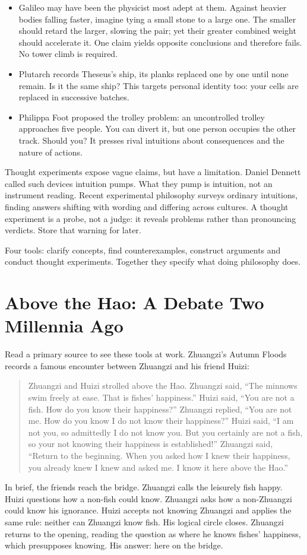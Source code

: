 \begin{itemize}
\item Galileo may have been the physicist most adept at them. Against heavier bodies falling faster, imagine tying a small stone to a large one. The smaller should retard the larger, slowing the pair; yet their greater combined weight should accelerate it. One claim yields opposite conclusions and therefore fails. No tower climb is required.
\item Plutarch records Theseus's ship, its planks replaced one by one until none remain. Is it the same ship? This targets personal identity too: your cells are replaced in successive batches.
\item Philippa Foot proposed the trolley problem: an uncontrolled trolley approaches five people. You can divert it, but one person occupies the other track. Should you? It presses rival intuitions about consequences and the nature of actions.
\end{itemize}
Thought experiments expose vague claims, but have a limitation. Daniel Dennett called such devices intuition pumps. What they pump is intuition, not an instrument reading. Recent experimental philosophy surveys ordinary intuitions, finding answers shifting with wording and differing across cultures. A thought experiment is a probe, not a judge: it reveals problems rather than pronouncing verdicts. Store that warning for later.

Four tools: clarify concepts, find counterexamples, construct arguments and conduct thought experiments. Together they specify what doing philosophy does.

\section[Debating above the Hao]{Above the Hao: A Debate Two Millennia Ago}
Read a primary source to see these tools at work. Zhuangzi's Autumn Floods records a famous encounter between Zhuangzi and his friend Huizi:

\begin{quote}
Zhuangzi and Huizi strolled above the Hao. Zhuangzi said, ``The minnows swim freely at ease. That is fishes' happiness.'' Huizi said, ``You are not a fish. How do you know their happiness?'' Zhuangzi replied, ``You are not me. How do you know I do not know their happiness?'' Huizi said, ``I am not you, so admittedly I do not know you. But you certainly are not a fish, so your not knowing their happiness is established!'' Zhuangzi said, ``Return to the beginning. When you asked how I knew their happiness, you already knew I knew and asked me. I know it here above the Hao.''
\end{quote}
In brief, the friends reach the bridge. Zhuangzi calls the leisurely fish happy. Huizi questions how a non-fish could know. Zhuangzi asks how a non-Zhuangzi could know his ignorance. Huizi accepts not knowing Zhuangzi and applies the same rule: neither can Zhuangzi know fish. His logical circle closes. Zhuangzi returns to the opening, reading the question as where he knows fishes' happiness, which presupposes knowing. His answer: here on the bridge.

